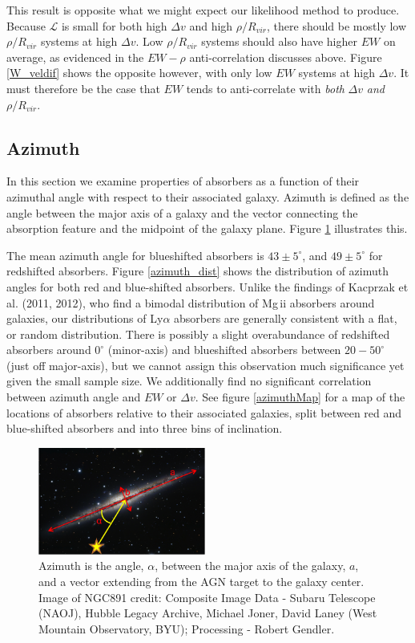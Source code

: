 \documentclass[iop]{emulateapj-rtx4}
\begin{document}
This result is opposite what we might expect our likelihood method to produce. Because $\mathcal{L}$ is small for both high $\Delta v$ and high $\rho / R_{vir}$, there should be mostly low $\rho / R_{vir}$ systems at high $\Delta v$. Low $\rho / R_{vir}$ systems should also have higher $EW$ on average, as evidenced in the $EW-\rho$ anti-correlation discusses above. Figure \ref{W_veldif} shows the opposite however, with only low $EW$ systems at high $\Delta v$. It must therefore be the case that $EW$ tends to anti-correlate with \textit{both} $\Delta v$ \textit{and} $\rho / R_{vir}$.


\subsection{Azimuth}
In this section we examine properties of absorbers as a function of their azimuthal angle with respect to their associated galaxy. Azimuth is defined as the angle between the major axis of a galaxy and the vector connecting the absorption feature and the midpoint of the galaxy plane. Figure \ref{azimuth_illustration} illustrates this. 

The mean azimuth angle for blueshifted absorbers is $43\pm5^{\circ}$, and $49\pm5^{\circ}$ for redshifted absorbers. Figure \ref{azimuth_dist} shows the distribution of azimuth angles for both red and blue-shifted absorbers. Unlike the findings of Kacprzak et al. (2011, 2012), who find a bimodal distribution of Mg\,{\sc ii} absorbers around galaxies, our distributions of Ly$\alpha$ absorbers are generally consistent with a flat, or random distribution. There is possibly a slight overabundance of redshifted absorbers around $0^{\circ}$ (minor-axis) and blueshifted absorbers between $20-50^{\circ}$ (just off major-axis), but we cannot assign this observation much significance yet given the small sample size. We additionally find no significant correlation between azimuth angle and $EW$ or $\Delta v$. See figure \ref{azimuthMap} for a map of the locations of absorbers relative to their associated galaxies, split between red and blue-shifted absorbers and into three bins of inclination.


\begin{figure}[ht!]
        \centering
        \includegraphics[width=0.49\textwidth]{azimuth_illustration2.png}
        \caption{\small{Azimuth is the angle, $\alpha$, between the major axis of the galaxy, $a$, and a vector extending from the AGN target to the galaxy center. Image of NGC891 credit: Composite Image Data - Subaru Telescope (NAOJ), Hubble Legacy Archive, Michael Joner, David Laney (West Mountain Observatory, BYU); Processing - Robert Gendler.}}
        \label{azimuth_illustration}
        \vspace{5pt}
\end{figure} 
\end{document}
